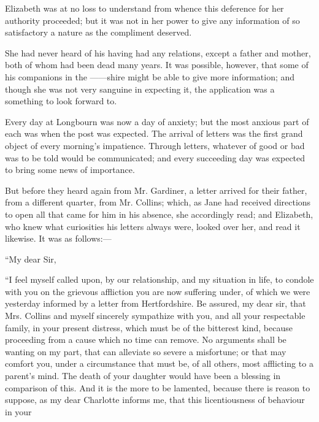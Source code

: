 \documentclass[10pt]{book}
\begin{document}
   Elizabeth was at no loss to understand from whence this deference for
her authority proceeded; but it was not in her power to give any
information of so satisfactory a nature as the compliment deserved.
  

   She had never heard of his having had any relations,
   except a father
and mother, both of whom had been dead many years. It was possible,
however, that some of his companions in the ——shire might be able to
give more information; and though she was not very sanguine in expecting
it, the application was a something to look forward to.
  

   Every day at Longbourn was now a day of anxiety; but the most anxious
part of each was when the post was expected. The arrival of letters was
the first grand object of every morning’s impatience. Through letters,
whatever of good or bad was to be told would be communicated; and every
succeeding day was expected to bring some news of importance.
  

   But before they heard again from Mr. Gardiner, a letter arrived for
their father, from a different quarter, from Mr. Collins; which, as Jane
had received directions to open all that came for him in his absence,
she accordingly read; and Elizabeth, who knew what curiosities his
letters always were, looked over her, and read it likewise. It was as
follows:—
  

    “My dear Sir,
   

    “I feel myself called upon, by our relationship, and my situation
in life, to condole with you on the grievous affliction you are now
suffering under, of which we were yesterday informed by a letter
from Hertfordshire. Be assured, my dear sir, that Mrs. Collins and
myself sincerely sympathize with you, and all your respectable
family, in your present distress, which must be of the bitterest
kind, because proceeding from a cause which no time can remove. No
arguments shall be wanting on my part, that can alleviate so severe
a misfortune; or that may comfort you, under a circumstance that
must be, of all others, most afflicting to a parent’s mind.
    The
death of your daughter would have been a blessing in comparison of
this. And it is the more to be lamented, because there is reason to
suppose, as my dear Charlotte informs me, that this licentiousness
of behaviour in your
   
\end{document}
